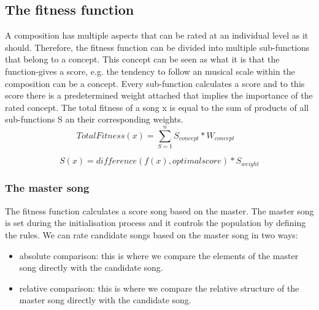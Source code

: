 
\subsection{The fitness function}
A composition has multiple aspects that can be rated at an individual level as it should. Therefore, the fitness function can be divided into multiple sub-functions that belong to a concept. This concept can be seen as what it is that the function-gives a score, e.g. the tendency to follow an musical scale within the composition can be a concept. Every sub-function calculates a score and to this score there is a predetermined weight attached that implies the importance of the rated concept. The total fitness of a song x is equal to the sum of products of all sub-functions S an their corresponding weights.
\[ TotalFitness(x) = \sum_{S=1}^{n} S_{concept} * W_{concept} \   \text{ }\] 


\[ S(x) =  difference( f(x) ,optimalscore) * S_{weight} \]

\subsubsection{The master song}
The fitness function calculates a score song based on the master. The master song is set during the initialisation process and it controls the population by defining the rules. We can rate candidate songs based on the master song in two ways:
\begin{itemize}
    \item absolute comparison: this is where we compare the elements of the master song directly with the candidate song.
    \item relative comparison: this is where we compare the relative structure of the master song directly with the candidate song.
\end{itemize}

